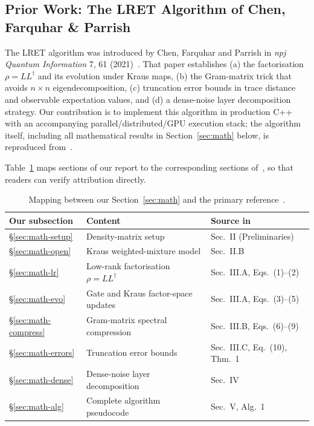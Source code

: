 \documentclass[11pt,a4paper]{article}
\begin{document}
\subsection{Prior Work: The LRET Algorithm of Chen, Farquhar \& Parrish}
\label{sec:bg-lret}

The LRET algorithm was introduced by Chen, Farquhar and Parrish in
\emph{npj Quantum Information} 7, 61 (2021)~\cite{chen2021lret}. That paper establishes
(a) the factorisation $\rho = LL^\dagger$ and its evolution under Kraus maps, (b) the
Gram-matrix trick that avoids $n \times n$ eigendecomposition, (c) truncation error
bounds in trace distance and observable expectation values, and (d) a dense-noise layer
decomposition strategy. Our contribution is to implement this algorithm in production
C++ with an accompanying parallel/distributed/GPU execution stack; the algorithm
itself, including all mathematical results in Section~\ref{sec:math} below, is
reproduced from~\cite{chen2021lret}.

Table~\ref{tab:lret-paper-index} maps sections of our report to the corresponding
sections of~\cite{chen2021lret}, so that readers can verify attribution directly.

\begin{table}[h]
\centering
\renewcommand{\arraystretch}{1.2}
\caption{Mapping between our Section~\ref{sec:math} and the primary
reference~\cite{chen2021lret}.}
\label{tab:lret-paper-index}
\begin{tabular}{@{}lll@{}}
\toprule
\textbf{Our subsection} & \textbf{Content} & \textbf{Source in~\cite{chen2021lret}} \\
\midrule
\S\ref{sec:math-setup}        & Density-matrix setup                   & Sec.\ II (Preliminaries) \\
\S\ref{sec:math-open}         & Kraus weighted-mixture model           & Sec.\ II.B \\
\S\ref{sec:math-lr}           & Low-rank factorisation $\rho=LL^\dagger$ & Sec.\ III.A, Eqs.\ (1)--(2) \\
\S\ref{sec:math-evo}          & Gate and Kraus factor-space updates    & Sec.\ III.A, Eqs.\ (3)--(5) \\
\S\ref{sec:math-compress}     & Gram-matrix spectral compression       & Sec.\ III.B, Eqs.\ (6)--(9) \\
\S\ref{sec:math-errors}       & Truncation error bounds                & Sec.\ III.C, Eq.\ (10), Thm.\ 1 \\
\S\ref{sec:math-dense}        & Dense-noise layer decomposition        & Sec.\ IV \\
\S\ref{sec:math-alg}          & Complete algorithm pseudocode          & Sec.\ V, Alg.\ 1 \\
\bottomrule
\end{tabular}
\end{table}
\end{document}
